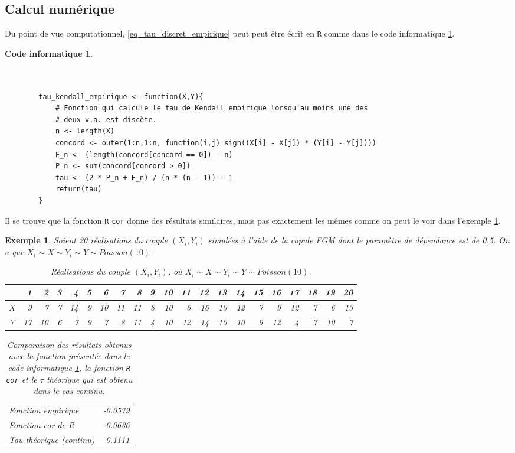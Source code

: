 \documentclass{article}
\newtheorem{code}{Code informatique}
\newtheorem{exemple}{Exemple}
\begin{document}
	\subsection{Calcul numérique}
	Du point de vue computationnel, \eqref{eq_tau_discret_empirique} peut peut être écrit en \texttt{R} comme dans le code informatique \ref{code_Kendall_empirique}.
	\begin{code}\label{code_Kendall_empirique}
		\begin{verbatim}
		
		
		tau_kendall_empirique <- function(X,Y){
		    # Fonction qui calcule le tau de Kendall empirique lorsqu'au moins une des 
		    # deux v.a. est discète.
		    n <- length(X)
		    concord <- outer(1:n,1:n, function(i,j) sign((X[i] - X[j]) * (Y[i] - Y[j])))
		    E_n <- (length(concord[concord == 0]) - n)
		    P_n <- sum(concord[concord > 0])
		    tau <- (2 * P_n + E_n) / (n * (n - 1)) - 1
		    return(tau)
		}
		\end{verbatim}
	\end{code}

	Il se trouve que la fonction \texttt{R} \texttt{cor} donne des résultats similaires, mais pas exactement les mêmes comme on peut le voir dans l'exemple \ref{exemple_code1}.
	
	\begin{exemple}\label{exemple_code1}
		Soient 20 réalisations du couple $(X_i, Y_i)$ simulées à l'aide de la copule FGM dont le paramètre de dépendance est de 0.5.
		On a que $X_i \sim X \sim Y_i \sim Y \sim Poisson(10)$.
		\begin{table}[H]
			\centering
			\begin{tabular}{rrrrrrrrrrrrrrrrrrrrr}
				\hline
				& 1 & 2 & 3 & 4 & 5 & 6 & 7 & 8 & 9 & 10 & 11 & 12 & 13 & 14 & 15 & 16 & 17 & 18 & 19 & 20 \\ 
				\hline
				X & 9 & 7 & 7 & 14 & 9 & 10 & 11 & 11 & 8 & 10 & 6 & 16 & 10 & 12 & 7 & 9 & 12 & 7 & 6 & 13 \\ 
				Y & 17 & 10 & 6 & 7 & 9 & 7 & 8 & 11 & 4 & 10 & 12 & 14 & 10 & 10 & 9 & 12 & 4 & 7 & 10 & 7 \\ 
				\hline
			\end{tabular}
		\caption{Réalisations du couple $(X_i,Y_i)$, où $X_i \sim X \sim Y_i \sim Y \sim Poisson(10)$. }
		\end{table}
	
	\begin{table}[H]
		\centering
		\begin{tabular}{lr}
			\hline
			Fonction empirique & -0.0579 \\ 
			Fonction cor de R & -0.0636 \\ 
			Tau théorique (continu) & 0.1111 \\ 
			\hline
		\end{tabular}
	\caption{Comparaison des résultats obtenus avec la fonction présentée dans le code informatique \ref{code_Kendall_empirique}, la fonction \texttt{R cor} et le $\tau$ théorique qui est obtenu dans le cas continu.}
	\label{tbl_Resultats_Code1}
	\end{table}
	\end{exemple}	
\end{document}
